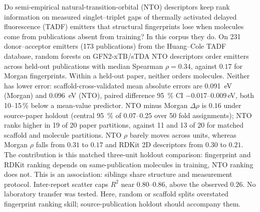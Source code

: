 Do semi-empirical natural-transition-orbital (NTO) descriptors keep rank
information on measured singlet--triplet gaps \deltaest of thermally
activated delayed fluorescence (TADF) emitters that structural fingerprints
lose when molecules come from publications absent from training? In this
corpus they do. On \num{231} donor--acceptor emitters (\num{173} publications)
from the Huang--Cole TADF database, random forests on GFN2-xTB/sTDA NTO
descriptors order emitters across held-out publications with median
Spearman $\rho = 0.34$, against $0.17$ for Morgan fingerprints. Within a
held-out paper, neither orders molecules.
%
Neither has lower error: scaffold-cross-validated mean absolute errors are
\qty{0.091}{\electronvolt} (Morgan) and \qty{0.096}{\electronvolt} (NTO), paired
difference \qty{95}{\percent} CI \numrange{-0.017}{0.009}\,\unit{\electronvolt},
both \numrange{10}{15}\,\unit{\percent} below a mean-value predictor.
%
NTO minus Morgan $\Delta\rho$ is $0.16$ under source-paper holdout (central \qty{95}{\percent} of
\numrange{0.07}{0.25} over \num{50} fold assignments); NTO ranks higher in
\num{19} of \num{20} paper partitions, against \num{11} and \num{13} of \num{20}
for matched scaffold and molecule partitions. NTO $\rho$ barely moves across
units, whereas Morgan $\rho$ falls from $0.31$ to $0.17$ and RDKit 2D
descriptors from $0.30$ to $0.21$. The contribution is this matched three-unit
holdout comparison: fingerprint and RDKit ranking depends on same-publication
molecules in training, NTO ranking does not. This is an association: siblings
share structure and measurement protocol.
%
Inter-report scatter caps $R^2$ near \numrange{0.80}{0.86}, above the observed
$0.26$. No laboratory transfer was tested. Here, random or scaffold splits
overstated fingerprint ranking skill; source-publication holdout should
accompany them.
